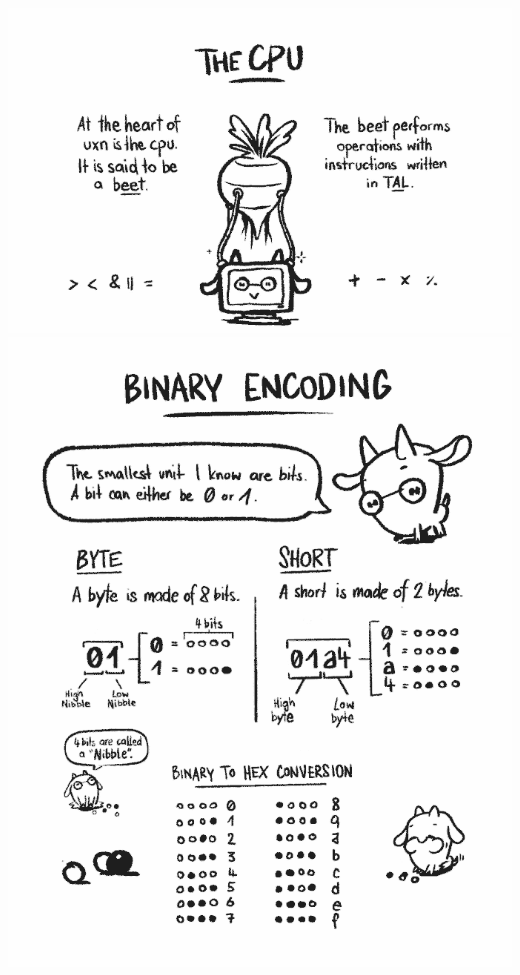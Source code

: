\documentclass[paperheight=4.25in,paperwidth=2.75in,20pt]{article}
\begin{document}
  \centering
  \includegraphics[width=1.0\paperwidth]{images/00_uxn_notes-680.png}
  \includegraphics[width=1.0\paperwidth]{images/01_binary_encoding-680.png}
\end{document}
